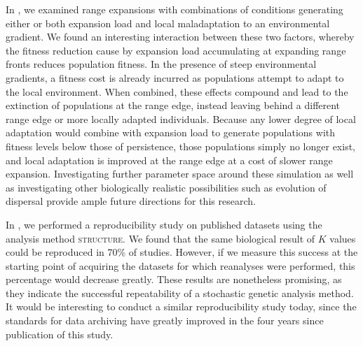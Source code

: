 In , we examined range expansions with combinations of conditions generating either or both expansion load and local maladaptation to an environmental gradient. We found an interesting interaction between these two factors, whereby the fitness reduction cause by expansion load accumulating at expanding range fronts reduces population fitness. In the presence of steep environmental gradients, a fitness cost is already incurred as populations attempt to adapt to the local environment. When combined, these effects compound and lead to the extinction of populations at the range edge, instead leaving behind a different range edge or more locally adapted individuals. Because any lower degree of local adaptation would combine with expansion load to generate populations with fitness levels below those of persistence, those populations simply no longer exist, and local adaptation is improved at the range edge at a cost of slower range expansion. Investigating further parameter space around these simulation as well as investigating other biologically realistic possibilities such as evolution of dispersal provide ample future directions for this research.

In , we performed a reproducibility study on published datasets using the analysis method \textsc{structure}. We found that the same biological result of $K$ values could be reproduced in 70\% of studies. However, if we measure this success at the starting point of acquiring the datasets for which reanalyses were performed, this percentage would decrease greatly. These results are nonetheless promising, as they indicate the successful repeatability of a stochastic genetic analysis method. It would be interesting to conduct a similar reproducibility study today, since the standards for data archiving have greatly improved in the four years since publication of this study.

